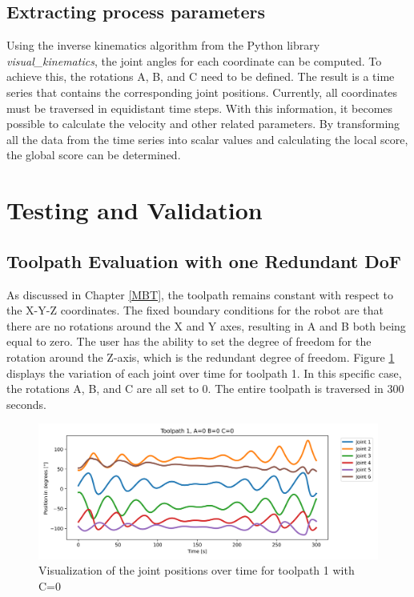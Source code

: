 \subsection{Extracting process parameters}
Using the inverse kinematics algorithm from the Python library \textit{visual\_kinematics}, the joint angles for each coordinate can be computed. To achieve this, the rotations A, B, and C need to be defined. The result is a time series that contains the corresponding joint positions. Currently, all coordinates must be traversed in equidistant time steps. With this information, it becomes possible to calculate the velocity and other related parameters. By transforming all the data from the time series into scalar values and calculating the local score, the global score can be determined.
\newpage
\section{Testing and Validation}%

\subsection{Toolpath Evaluation with one Redundant DoF}
As discussed in Chapter \ref{MBT}, the toolpath remains constant with respect to the X-Y-Z coordinates. The fixed boundary conditions for the robot are that there are no rotations around the X and Y axes, resulting in A and B both being equal to zero. The user has the ability to set the degree of freedom for the rotation around the Z-axis, which is the redundant degree of freedom. Figure \ref{TP1ABC0} displays the variation of each joint over time for toolpath 1. In this specific case, the rotations A, B, and C are all set to 0. The entire toolpath is traversed in 300 seconds.

\begin{figure}[H]
	\centerline{\includegraphics[width=1\textwidth]{figures/TP1ABC0.png}}
	\caption{Visualization of the joint positions over time for toolpath 1 with C=0}
	\label{TP1ABC0}
\end{figure}

